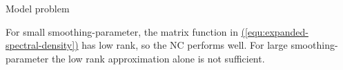 \documentclass[final, 12pt]{beamer}
\newcommand{\refequ}[1]{\hyperref[#1]{\textcolor{linkcolor}{(\ref*{#1})}}}
\begin{document}
\begin{frame}[t]
\begin{columns}[t]
\begin{column}{0.45\paperwidth}
\begin{block}{Model problem}
            \begin{figure}
                \scalebox{1.6}{}
                \scalebox{1.6}{}
                \scalebox{1.6}{}
            \end{figure}

            For small \gls{smoothing-parameter}, the
            matrix function in \refequ{equ:expanded-spectral-density} has low rank,
            so the \gls{NC} performs well. For large \gls{smoothing-parameter}
            the low rank approximation alone is not sufficient.%
            \begin{figure}
                \scalebox{1.6}{}
            \end{figure}
            \vspace{-30pt}
        \end{block}

    \end{column}

    \begin{column}{0.45\paperwidth}


\end{column}
\end{columns}
\end{frame}
\end{document}

